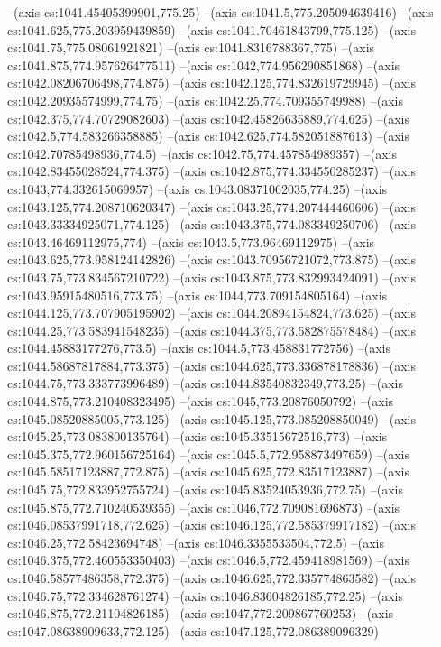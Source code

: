 --(axis cs:1041.45405399901,775.25)
--(axis cs:1041.5,775.205094639416)
--(axis cs:1041.625,775.203959439859)
--(axis cs:1041.70461843799,775.125)
--(axis cs:1041.75,775.08061921821)
--(axis cs:1041.8316788367,775)
--(axis cs:1041.875,774.957626477511)
--(axis cs:1042,774.956290851868)
--(axis cs:1042.08206706498,774.875)
--(axis cs:1042.125,774.832619729945)
--(axis cs:1042.20935574999,774.75)
--(axis cs:1042.25,774.709355749988)
--(axis cs:1042.375,774.70729082603)
--(axis cs:1042.45826635889,774.625)
--(axis cs:1042.5,774.583266358885)
--(axis cs:1042.625,774.582051887613)
--(axis cs:1042.70785498936,774.5)
--(axis cs:1042.75,774.457854989357)
--(axis cs:1042.83455028524,774.375)
--(axis cs:1042.875,774.334550285237)
--(axis cs:1043,774.332615069957)
--(axis cs:1043.08371062035,774.25)
--(axis cs:1043.125,774.208710620347)
--(axis cs:1043.25,774.207444460606)
--(axis cs:1043.33334925071,774.125)
--(axis cs:1043.375,774.083349250706)
--(axis cs:1043.46469112975,774)
--(axis cs:1043.5,773.96469112975)
--(axis cs:1043.625,773.958124142826)
--(axis cs:1043.70956721072,773.875)
--(axis cs:1043.75,773.834567210722)
--(axis cs:1043.875,773.832993424091)
--(axis cs:1043.95915480516,773.75)
--(axis cs:1044,773.709154805164)
--(axis cs:1044.125,773.707905195902)
--(axis cs:1044.20894154824,773.625)
--(axis cs:1044.25,773.583941548235)
--(axis cs:1044.375,773.582875578484)
--(axis cs:1044.45883177276,773.5)
--(axis cs:1044.5,773.458831772756)
--(axis cs:1044.58687817884,773.375)
--(axis cs:1044.625,773.336878178836)
--(axis cs:1044.75,773.333773996489)
--(axis cs:1044.83540832349,773.25)
--(axis cs:1044.875,773.210408323495)
--(axis cs:1045,773.20876050792)
--(axis cs:1045.08520885005,773.125)
--(axis cs:1045.125,773.085208850049)
--(axis cs:1045.25,773.083800135764)
--(axis cs:1045.33515672516,773)
--(axis cs:1045.375,772.960156725164)
--(axis cs:1045.5,772.958873497659)
--(axis cs:1045.58517123887,772.875)
--(axis cs:1045.625,772.83517123887)
--(axis cs:1045.75,772.833952755724)
--(axis cs:1045.83524053936,772.75)
--(axis cs:1045.875,772.710240539355)
--(axis cs:1046,772.709081696873)
--(axis cs:1046.08537991718,772.625)
--(axis cs:1046.125,772.585379917182)
--(axis cs:1046.25,772.58423694748)
--(axis cs:1046.3355533504,772.5)
--(axis cs:1046.375,772.460553350403)
--(axis cs:1046.5,772.459418981569)
--(axis cs:1046.58577486358,772.375)
--(axis cs:1046.625,772.335774863582)
--(axis cs:1046.75,772.334628761274)
--(axis cs:1046.83604826185,772.25)
--(axis cs:1046.875,772.21104826185)
--(axis cs:1047,772.209867760253)
--(axis cs:1047.08638909633,772.125)
--(axis cs:1047.125,772.086389096329)
